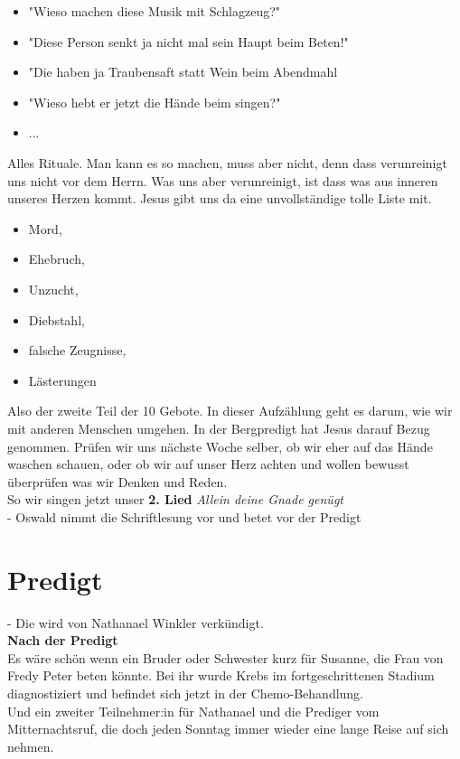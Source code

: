 \documentclass{../inc/mybib}
\begin{document}
\begin{itemize}
    \item "Wieso machen diese Musik mit Schlagzeug?" 
    \item "Diese Person senkt ja nicht mal sein Haupt beim Beten!"
    \item "Die haben ja Traubensaft statt Wein beim Abendmahl
    \item "Wieso hebt er jetzt die Hände beim singen?"
    \item ...
\end{itemize}
Alles Rituale. Man kann es so machen, muss aber nicht, denn dass verunreinigt uns nicht vor dem Herrn. 
Was uns aber verunreinigt, ist dass was aus inneren unseres Herzen kommt. Jesus gibt uns da eine unvollständige tolle Liste mit.
\begin{itemize}
    \item Mord, 
    \item Ehebruch, 
    \item Unzucht, 
    \item Diebstahl, 
    \item falsche Zeugnisse, 
    \item Lästerungen
\end{itemize}
Also der zweite Teil der 10 Gebote. In dieser Aufzählung geht es darum, wie wir mit anderen Menschen umgehen. In der Bergpredigt hat Jesus darauf Bezug genommen. Prüfen wir uns nächste Woche selber, ob wir eher auf das Hände waschen schauen, oder ob wir auf unser Herz achten und wollen bewusst überprüfen was wir Denken und Reden.
\\ So wir singen jetzt unser \textbf{2. Lied} \textit{Allein deine Gnade genügt}\\

- Oswald nimmt die Schriftlesung vor und betet vor der Predigt

\section{Predigt}
- Die wird von Nathanael Winkler verkündigt.\\

\textbf{Nach der Predigt}\\
Es wäre schön wenn ein Bruder oder Schwester kurz für Susanne, die Frau von Fredy Peter beten könnte. 
Bei ihr wurde Krebs im fortgeschrittenen Stadium diagnostiziert und befindet sich jetzt in der Chemo-Behandlung.\\

Und ein zweiter Teilnehmer:in für Nathanael und die Prediger vom Mitternachtsruf, die doch jeden Sonntag immer wieder eine lange Reise auf sich nehmen.\\
\end{document}
